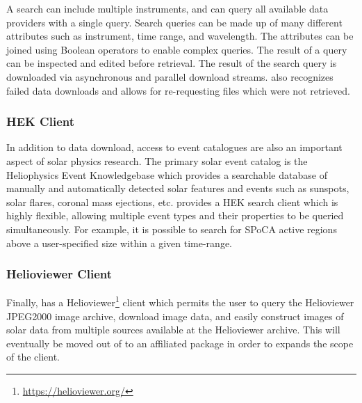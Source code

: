 A \Fido search can include multiple instruments, and can query all available data providers with a single query.
Search queries can be made up of many different attributes such as instrument, time range, and wavelength.
The attributes can be joined using Boolean operators to enable complex queries.
The result of a query can be inspected and edited before retrieval.
The result of the \Fido search query is downloaded via asynchronous and parallel download streams.
\Fido also recognizes failed data downloads and allows for re-requesting files which were not retrieved.

\subsubsection{HEK Client}
\label{sec:hek}

In addition to data download, access to event catalogues are also an important aspect of solar physics research.
The primary solar event catalog is the Heliophysics Event Knowledgebase \citep[HEK,][]{hek} which provides a searchable database of manually and automatically detected solar features and events such as sunspots, solar flares, coronal mass ejections, etc. \sunpypkg provides a HEK search client which is highly flexible, allowing multiple event types and their properties to be queried simultaneously.
For example, it is possible to search for SPoCA \citep{2014AA...561A..29V} active regions above a user-specified size within a given time-range.

\subsubsection{Helioviewer Client}
\label{sec:helioviewer}

Finally,  has a Helioviewer\footnote{\url{https://helioviewer.org/}} client which permits the user to query the Helioviewer JPEG2000 image archive, download image data, and easily construct images of solar data from multiple sources available at the Helioviewer archive.
This will eventually be moved out of \sunpypkg to an affiliated package in order to expands the scope of the client.
